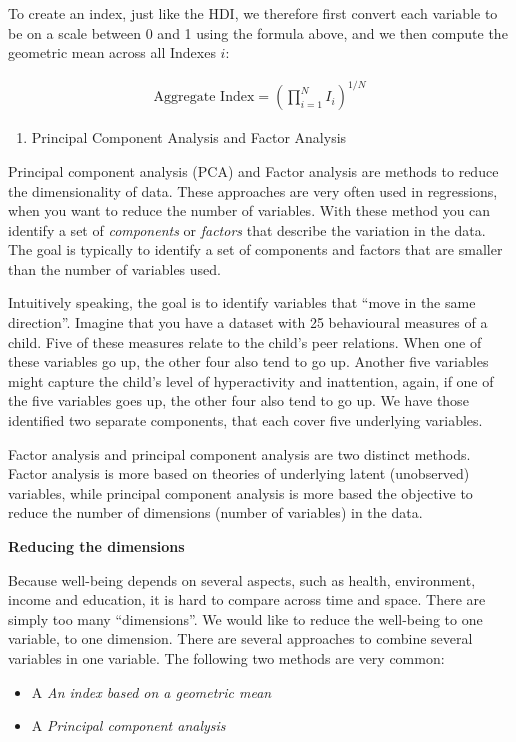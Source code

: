 \documentclass[]{book}
\providecommand{\tightlist}{%
  \setlength{\itemsep}{0pt}\setlength{\parskip}{0pt}}
\newenvironment{myblock}%
{%
 \begin{tcolorbox}%
}%
{\end{tcolorbox}}%
\begin{document}
To create an index, just like the HDI, we therefore first convert each variable to be on a scale between 0 and 1 using the formula above, and we then compute the geometric mean across all Indexes \(i\):

\begin{align}
   \text{Aggregate Index}=\left(\prod_{i=1}^N I_i\right)^{1/N}
\end{align}

\begin{enumerate}
\def\labelenumi{\arabic{enumi}.}
\setcounter{enumi}{1}
\tightlist
\item
  Principal Component Analysis and Factor Analysis
\end{enumerate}

Principal component analysis (PCA) and Factor analysis are methods to reduce the dimensionality of data. These approaches are very often used in regressions, when you want to reduce the number of variables. With these method you can identify a set of \emph{components} or \emph{factors} that describe the variation in the data. The goal is typically to identify a set of components and factors that are smaller than the number of variables used.

Intuitively speaking, the goal is to identify variables that ``move in the same direction''. Imagine that you have a dataset with 25 behavioural measures of a child. Five of these measures relate to the child's peer relations. When one of these variables go up, the other four also tend to go up. Another five variables might capture the child's level of hyperactivity and inattention, again, if one of the five variables goes up, the other four also tend to go up. We have those identified two separate components, that each cover five underlying variables.

Factor analysis and principal component analysis are two distinct methods. Factor analysis is more based on theories of underlying latent (unobserved) variables, while principal component analysis is more based the objective to reduce the number of dimensions (number of variables) in the data.

\begin{myblock}
\textbf{Reducing the dimensions}

Because well-being depends on several aspects, such as health,
environment, income and education, it is hard to compare across time and
space. There are simply too many ``dimensions''. We would like to reduce
the well-being to one variable, to one dimension. There are several
approaches to combine several variables in one variable. The following
two methods are very common:

\begin{itemize}
\tightlist
\item
  A \emph{An index based on a geometric mean}
\item
  A \emph{Principal component analysis}
\end{itemize}
\end{myblock}
\end{document}
